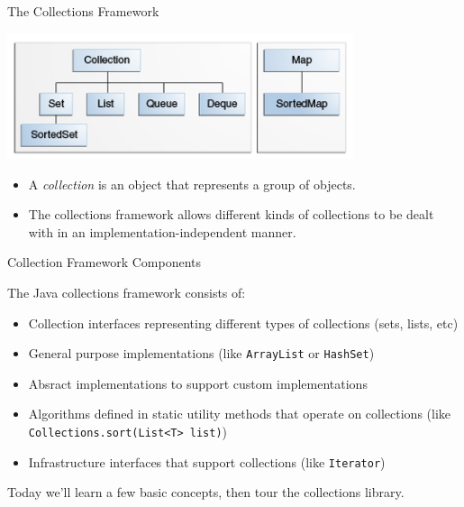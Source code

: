 \documentclass{beamer}
\begin{document}
\begin{frame}
  \titlepage
\end{frame}


\begin{frame}[fragile]{The Collections Framework}

\begin{center}
\includegraphics[width=4in]{colls-coreInterfaces.png}
\end{center}

\begin{itemize}
\item A {\it collection} is an object that represents a group of objects.
\item The collections framework allows different kinds of collections to be dealt with in an implementation-independent manner.
\end{itemize}


\end{frame}

\begin{frame}[fragile]{Collection Framework Components}

The Java collections framework consists of:
\begin{itemize}
\item Collection interfaces representing different types of collections (sets, lists, etc)
\item General purpose implementations (like {\tt ArrayList} or {\tt HashSet})
\item Absract implementations to support custom implementations
\item Algorithms defined in static utility methods that operate on collections (like {\tt Collections.sort(List<T> list)})
\item Infrastructure interfaces that support collections (like {\tt Iterator})
\end{itemize}
Today we'll learn a few basic concepts, then tour the collections library.
\end{frame}
\end{document}
